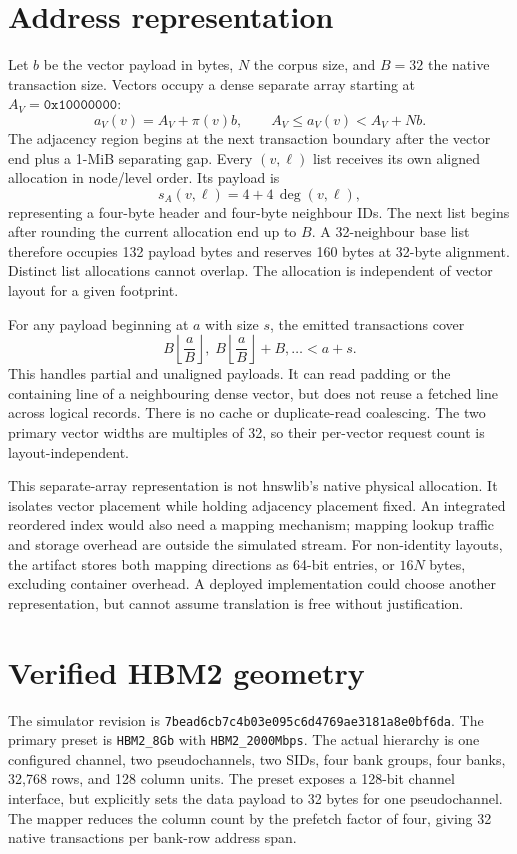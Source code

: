 \documentclass[11pt,a4paper]{report}
\begin{document}
\section{Address representation}
Let $b$ be the vector payload in bytes, $N$ the corpus size, and $B=32$ the native transaction size. Vectors occupy a dense separate array starting at $A_V=\mathtt{0x10000000}$:
\begin{equation}
 a_V(v)=A_V+\pi(v)b,\qquad A_V\leq a_V(v)<A_V+Nb.
\end{equation}
The adjacency region begins at the next transaction boundary after the vector end plus a 1-MiB separating gap. Every $(v,\ell)$ list receives its own aligned allocation in node/level order. Its payload is
\begin{equation}
 s_A(v,\ell)=4+4\,\deg(v,\ell),
\end{equation}
representing a four-byte header and four-byte neighbour IDs. The next list begins after rounding the current allocation end up to $B$. A 32-neighbour base list therefore occupies 132 payload bytes and reserves 160 bytes at 32-byte alignment. Distinct list allocations cannot overlap. The allocation is independent of vector layout for a given footprint.

For any payload beginning at $a$ with size $s$, the emitted transactions cover
\begin{equation}
 B\left\lfloor\frac{a}{B}\right\rfloor,\;B\left\lfloor\frac{a}{B}\right\rfloor+B,\ldots < a+s.
\end{equation}
This handles partial and unaligned payloads. It can read padding or the containing line of a neighbouring dense vector, but does not reuse a fetched line across logical records. There is no cache or duplicate-read coalescing. The two primary vector widths are multiples of 32, so their per-vector request count is layout-independent.

This separate-array representation is not hnswlib's native physical allocation. It isolates vector placement while holding adjacency placement fixed. An integrated reordered index would also need a mapping mechanism; mapping lookup traffic and storage overhead are outside the simulated stream. For non-identity layouts, the artifact stores both mapping directions as 64-bit entries, or $16N$ bytes, excluding container overhead. A deployed implementation could choose another representation, but cannot assume translation is free without justification.

\section{Verified HBM2 geometry}
\label{sec:geometry}
The simulator revision is \texttt{7bead6cb7c4b03e095c6d4769ae3181a8e0bf6da}. The primary preset is \texttt{HBM2\_8Gb} with \texttt{HBM2\_2000Mbps}. The actual hierarchy is one configured channel, two pseudochannels, two SIDs, four bank groups, four banks, 32,768 rows, and 128 column units. The preset exposes a 128-bit channel interface, but explicitly sets the data payload to 32 bytes for one pseudochannel. The mapper reduces the column count by the prefetch factor of four, giving 32 native transactions per bank-row address span.
\end{document}
